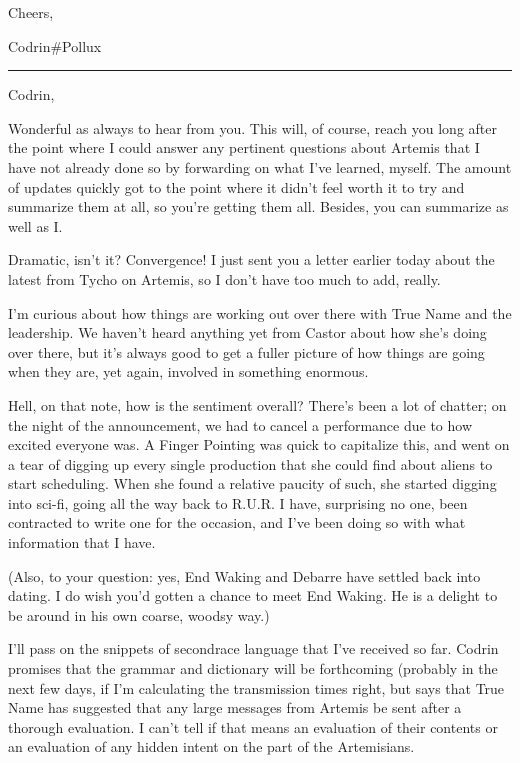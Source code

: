 Cheers,

Codrin\#Pollux

\begin{center}\rule{0.5\linewidth}{0.5pt}\end{center}

\noindent Codrin,

Wonderful as always to hear from you. This will, of course, reach you long after the point where I could answer any pertinent questions about Artemis that I have not already done so by forwarding on what I've learned, myself. The amount of updates quickly got to the point where it didn't feel worth it to try and summarize them at all, so you're getting them all. Besides, you can summarize as well as I.

Dramatic, isn't it? Convergence! I just sent you a letter earlier today about the latest from Tycho on Artemis, so I don't have too much to add, really.

I'm curious about how things are working out over there with True Name and the leadership. We haven't heard anything yet from Castor about how she's doing over there, but it's always good to get a fuller picture of how things are going when they are, yet again, involved in something enormous.

Hell, on that note, how is the sentiment overall? There's been a lot of chatter; on the night of the announcement, we had to cancel a performance due to how excited everyone was. A Finger Pointing was quick to capitalize this, and went on a tear of digging up every single production that she could find about aliens to start scheduling. When she found a relative paucity of such, she started digging into sci-fi, going all the way back to R.U.R. I have, surprising no one, been contracted to write one for the occasion, and I've been doing so with what information that I have.

(Also, to your question: yes, End Waking and Debarre have settled back into dating. I do wish you'd gotten a chance to meet End Waking. He is a delight to be around in his own coarse, woodsy way.)


I'll pass on the snippets of secondrace language that I've received so far. Codrin promises that the grammar and dictionary will be forthcoming (probably in the next few days, if I'm calculating the transmission times right, but says that True Name has suggested that any large messages from Artemis be sent after a thorough evaluation. I can't tell if that means an evaluation of their contents or an evaluation of any hidden intent on the part of the Artemisians.

